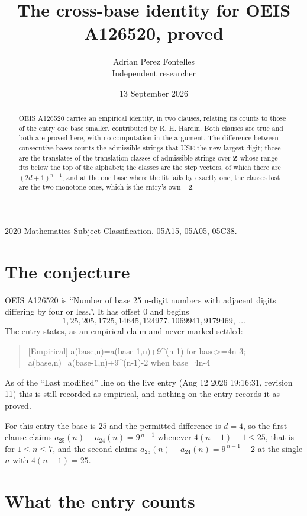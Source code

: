 \documentclass[11pt,a4paper]{article}
\title{The cross-base identity for OEIS A126520, proved}
\author{Adrian Perez Fontelles\\ \small Independent researcher}
\date{13 September 2026}
\theoremstyle{plain}
\theoremstyle{definition}
\begin{document}
\maketitle

\begin{abstract}
OEIS A126520 carries an empirical identity, in two clauses, relating its counts to those of the
entry one base smaller, contributed by R. H. Hardin. Both clauses are true and both are proved
here, with no computation in the argument. The difference between consecutive bases counts the
admissible strings that USE the new largest digit; those are the translates of the
translation-classes of admissible strings over $\mathbf{Z}$ whose range fits below the top of
the alphabet; the classes are the step vectors, of which there are $(2d+1)^{n-1}$; and at the
one base where the fit fails by exactly one, the classes lost are the two monotone ones, which
is the entry's own $-2$.
\end{abstract}

\noindent\small 2020 Mathematics Subject Classification. 05A15, 05A05, 05C38.\normalsize

\section{The conjecture}

OEIS A126520 is ``Number of base 25 n-digit numbers with adjacent digits differing by four or less.''. It has offset $0$ and begins
\[
1, 25, 205, 1725, 14645, 124977, 1069941, 9179469,\ \dots
\]
The entry states, as an empirical claim and never marked settled:
\begin{quote}
[Empirical] a(base,n)=a(base-1,n)+9\textasciicircum{}(n-1) for base>=4n-3; a(base,n)=a(base-1,n)+9\textasciicircum{}(n-1)-2 when base=4n-4
\end{quote}
As of the ``Last modified'' line on the live entry (Aug 12 2026 19:16:31, revision 11)
this is still recorded as empirical, and nothing on the entry records it as proved.

For this entry the base is $25$ and the permitted difference is $d=4$, so the first clause
claims $a_{25}(n)-a_{24}(n)=9^{\,n-1}$ whenever $4(n-1)+1\le25$, that is for
$1\le n\le7$, and the second claims $a_{25}(n)-a_{24}(n)=9^{\,n-1}-2$ at the single
$n$ with $4(n-1)=25$.

\section{What the entry counts}
\end{document}
